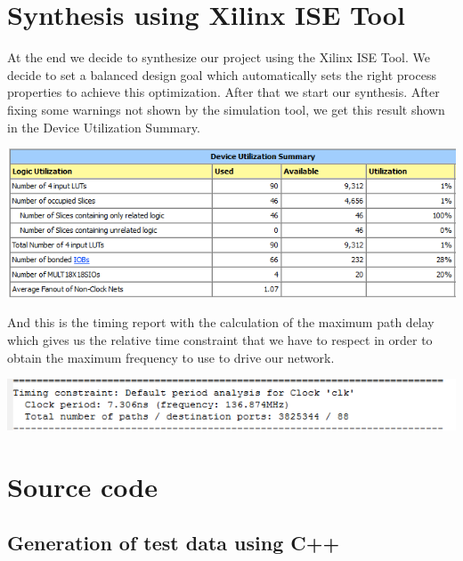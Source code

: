 \documentclass[12pt,a4paper]{report}
\begin{document}
\chapter{Synthesis using Xilinx ISE Tool}
At the end we decide to synthesize our project using the Xilinx ISE Tool. We decide to set a balanced design goal which automatically sets the right process properties to achieve this optimization. After that we start our synthesis.
After fixing some warnings not shown by the simulation tool, we get this result shown in the Device Utilization Summary. 

\begin{center}
\includegraphics[scale=0.9]{img/utilizationSummary.png}
\end{center}


And this is the timing report with the calculation of the maximum path delay which gives us the relative time constraint that we have to respect in order to obtain the maximum frequency to use to drive our network.

\begin{center}
\includegraphics[scale=0.9]{img/timingReport.png}
\end{center}


\appendix

\chapter{Source code}

\section{Generation of test data using C++}
\end{document}
